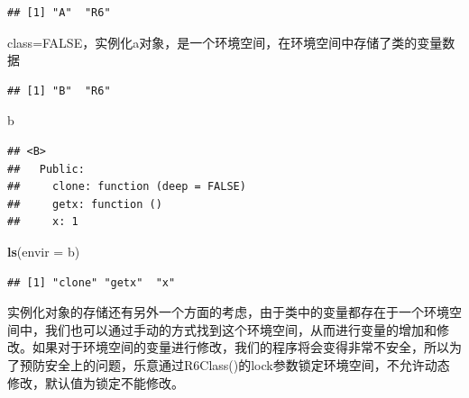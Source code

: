 \documentclass[]{book}
\newenvironment{Shaded}{\begin{snugshade}}{\end{snugshade}}
\newcommand{\KeywordTok}[1]{\textcolor[rgb]{0.13,0.29,0.53}{\textbf{#1}}}
\newcommand{\DataTypeTok}[1]{\textcolor[rgb]{0.13,0.29,0.53}{#1}}
\newcommand{\DecValTok}[1]{\textcolor[rgb]{0.00,0.00,0.81}{#1}}
\newcommand{\StringTok}[1]{\textcolor[rgb]{0.31,0.60,0.02}{#1}}
\newcommand{\OtherTok}[1]{\textcolor[rgb]{0.56,0.35,0.01}{#1}}
\newcommand{\ControlFlowTok}[1]{\textcolor[rgb]{0.13,0.29,0.53}{\textbf{#1}}}
\newcommand{\OperatorTok}[1]{\textcolor[rgb]{0.81,0.36,0.00}{\textbf{#1}}}
\newcommand{\NormalTok}[1]{#1}
\begin{document}
\begin{verbatim}
## [1] "A"  "R6"
\end{verbatim}

class=FALSE，实例化a对象，是一个环境空间，在环境空间中存储了类的变量数据

\begin{Shaded}
\end{Shaded}

\begin{verbatim}
## [1] "B"  "R6"
\end{verbatim}

\begin{Shaded}
\begin{Highlighting}[]
\NormalTok{b}
\end{Highlighting}
\end{Shaded}

\begin{verbatim}
## <B>
##   Public:
##     clone: function (deep = FALSE) 
##     getx: function () 
##     x: 1
\end{verbatim}

\begin{Shaded}
\begin{Highlighting}[]
\KeywordTok{ls}\NormalTok{(}\DataTypeTok{envir =}\NormalTok{ b)}
\end{Highlighting}
\end{Shaded}

\begin{verbatim}
## [1] "clone" "getx"  "x"
\end{verbatim}

实例化对象的存储还有另外一个方面的考虑，由于类中的变量都存在于一个环境空间中，我们也可以通过手动的方式找到这个环境空间，从而进行变量的增加和修改。如果对于环境空间的变量进行修改，我们的程序将会变得非常不安全，所以为了预防安全上的问题，乐意通过R6Class()的lock参数锁定环境空间，不允许动态修改，默认值为锁定不能修改。
\end{document}
